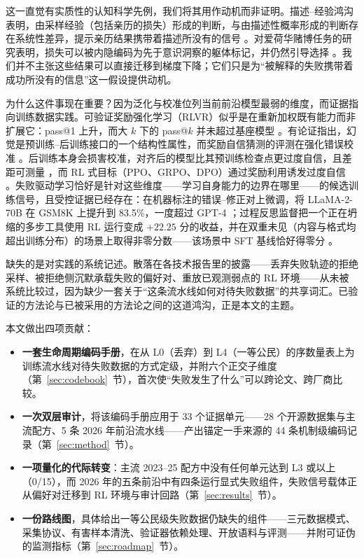 \documentclass[10pt,fontset=fandol]{ctexart}
\begin{document}
这一直觉有实质性的认知科学先例，我们将其用作动机而非证明。描述--经验鸿沟表明，由采样经验（包括亲历的损失）形成的判断，与由描述性概率形成的判断存在系统性差异，提示亲历结果携带着描述所没有的信号 \cite{hertwig2009}。对爱荷华赌博任务的研究表明，损失可以被内隐编码为先于意识洞察的躯体标记，并仍然引导选择 \cite{bechara2005}。我们并不主张这些结果可以直接迁移到梯度下降；它们只是为“被解释的失败携带着成功所没有的信息”这一假设提供动机。

为什么这件事现在重要？因为泛化与校准位列当前前沿模型最弱的维度，而证据指向训练数据实践。可验证奖励强化学习（RLVR）似乎是在重新加权既有能力而非扩展它：pass@1 上升，而大 $k$ 下的 pass@$k$ 并未超过基座模型 \cite{yue2025rlvr}。有论证指出，幻觉是预训练--后训练接口的一个结构性属性，而奖励自信猜测的评测在强化错误校准 \cite{kalai2025halluc}。后训练本身会损害校准，对齐后的模型比其预训练检查点更过度自信，且差距可测量 \cite{he2023calibration}，而 RL 式目标（PPO、GRPO、DPO）通过奖励利用诱发过度自信 \cite{xie2026know}。失败驱动学习恰好是针对这些维度——学习自身能力的边界在哪里——的候选训练信号，且受控证据已经存在：在机器标注的错误--修正对上微调，将 LLaMA-2-70B 在 GSM8K 上提升到 83.5\%，一度超过 GPT-4 \cite{an2023lema}；过程反思监督把一个正在坍缩的多步工具使用 RL 运行变成 $+22.25$ 分的收益，并在双重未见（内容与格式均超出训练分布）的场景上取得非零分数——该场景中 SFT 基线恰好得零分 \cite{hao2026prs}。

缺失的是对实践的系统记述。散落在各技术报告里的披露——丢弃失败轨迹的拒绝采样、被拒绝侧沉默承载失败的偏好对、重放已观测弱点的 RL 环境——从未被系统比较过，因为缺少一套关于“这条流水线如何对待失败数据”的共享词汇。已验证的方法论与已被采用的方法论之间的这道鸿沟，正是本文的主题。

本文做出四项贡献：

\begin{itemize}
\item \textbf{一套生命周期编码手册}，在从 L0（丢弃）到 L4（一等公民）的序数量表上为训练流水线对待失败数据的方式定级，并附六个正交子维度（第~\ref{sec:codebook}~节），首次使“失败发生了什么”可以跨论文、跨厂商比较。
\item \textbf{一次双层审计}，将该编码手册应用于 33 个证据单元——28 个开源数据集与主流配方、5 条 2026 年前沿流水线——产出锚定一手来源的 44 条机制级编码记录（第~\ref{sec:method}~节）。
\item \textbf{一项量化的代际转变}：主流 2023--25 配方中没有任何单元达到 L3 或以上（0/15），而 2026 年的五条前沿中有四条运行显式失败组件，失败信号载体正从偏好对迁移到 RL 环境与审计回路（第~\ref{sec:results}~节）。
\item \textbf{一份路线图}，具体给出一等公民级失败数据仍缺失的组件——三元数据模式、采集协议、有害样本清洗、验证器依赖处理、开放语料与评测——并附可证伪的监测指标（第~\ref{sec:roadmap}~节）。
\end{itemize}
\end{document}
